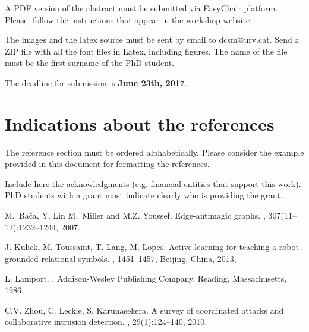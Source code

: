 \documentclass{dcsm}
\begin{document}
A PDF version of the abstract must be submitted via EasyChair platform. Please, follow the instructions that appear in the workshop website.

The images and the latex source must be sent by email to dcsm@urv.cat. Send a ZIP file with all the font files in Latex, including figures. The name of the file must be the first surname of the PhD student.

The deadline for submission is {\bf June 23th, 2017}.

\section{Indications about the references}
The reference section must be ordered alphabetically. Please consider the example provided in this document for formatting the references.

\begin{acknowledgement}
Include here the acknowledgments (e.g. financial entities that support this work).
PhD students with a grant must indicate clearly who is providing the grant.
\end{acknowledgement}
\begin{thebibliography}{1}


M.~Ba\v ca, Y. Lin M.~Miller and M.Z. Youssef.
\newblock Edge-antimagic graphs.
, 307(11--12):1232--1244, 2007.

J. Kulick, M. Toussaint, T. Lang, M. Lopes.
\newblock Active learning for teaching a robot grounded relational symbols.
, 1451--1457, Beijing, China, 2013,


L. Lamport.
.
\newblock Addison-Wesley Publishing Company, Reading, Massachusetts, 1986.


C.V. Zhou, C. Leckie, S. Karunasekera.
\newblock  A survey of coordinated attacks and collaborative intrusion detection.
, 29(1):124--140, 2010.


\end{thebibliography}
\end{document}
